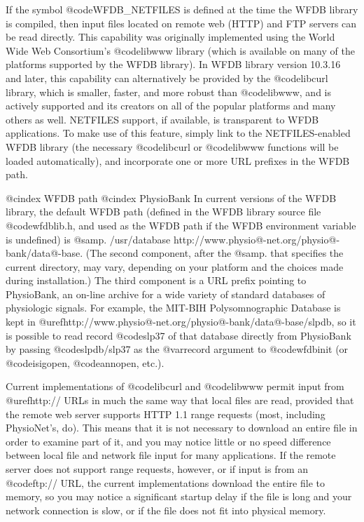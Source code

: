 {{{{{{{{{{If the symbol @code{WFDB_NETFILES} is defined at the time the WFDB library is
compiled, then input files located on remote web (HTTP) and FTP servers can be
read directly.  This capability was originally implemented using the World Wide
Web Consortium's @code{libwww} library (which is available on many of the
platforms supported by the WFDB library).  In WFDB library version 10.3.16 and
later, this capability can alternatively be provided by the @code{libcurl}
library, which is smaller, faster, and more robust than @code{libwww}, and is
actively supported and its creators on all of the popular platforms and many
others as well.  NETFILES support, if available, is transparent to WFDB
applications.  To make use of this feature, simply link to the NETFILES-enabled
WFDB library (the necessary @code{libcurl} or @code{libwww} functions will be
loaded automatically), and incorporate one or more URL prefixes in the WFDB
path.

@cindex WFDB path
@cindex PhysioBank
In current versions of the WFDB library, the default WFDB path (defined in the
WFDB library source file @code{wfdblib.h}, and used as the WFDB path if the
WFDB environment variable is undefined) is @samp{. /usr/database
http://www.physio@-net.org/physio@-bank/data@-base}.  (The second component,
after the @samp{.} that specifies the current directory, may vary, depending on
your platform and the choices made during installation.)  The third component
is a URL prefix pointing to PhysioBank, an on-line archive for a wide variety
of standard databases of physiologic signals.
For example, the MIT-BIH Polysomnographic Database is kept in
@uref{http://www.physio@-net.org/physio@-bank/data@-base/slpdb}, so it is
possible to read record @code{slp37} of that database directly from PhysioBank
by passing @code{slpdb/slp37} as the @var{record} argument to @code{wfdbinit}
(or @code{isigopen}, @code{annopen}, etc.).

Current implementations of @code{libcurl} and @code{libwww} permit input from
@uref{http://} URLs in much the same way that local files are read, provided
that the remote web server supports HTTP 1.1 range requests (most, including
PhysioNet's, do).  This means that it is not necessary to download an entire
file in order to examine part of it, and you may notice little or no speed
difference between local file and network file input for many applications.  If
the remote server does not support range requests, however, or if input is from
an @code{ftp://} URL, the current implementations download the entire file to
memory, so you may notice a significant startup delay if the file is long and
your network connection is slow, or if the file does not fit into physical
memory.

}}}}}}}}}}
